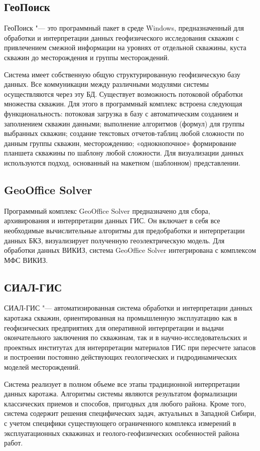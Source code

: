 \subsection{ГеоПоиск} \label{subsect_Poisk}
ГеоПоиск "--- это программный пакет в среде Windows, предназначенный для
обработки и интерпретации данных геофизического исследования скважин с
привлечением смежной информации на уровнях от отдельной скважины, куста
скважин до месторождения и группы месторождений.

Система имеет собственную общую структурированную геофизическую базу
данных. Все коммуникации между различными модулями системы осуществляются
через эту БД. Существует возможность потоковой обработки множества скважин.
Для этого в программный комплекс встроена следующая функциональность:
потоковая загрузка в базу с автоматическим созданием и заполнением скважин
данными; выполнение алгоритмов (формул) для группы выбранных скважин;
создание текстовых отчетов-таблиц любой сложности по данным группы скважин,
месторождению; «однокнопочное» формирование планшета скважины по шаблону
любой сложности. Для визуализации данных используются подход, основанный на
макетном (шаблонном) представлении.

\subsection{GeoOffice Solver} \label{subsect_Solver}
Программный комплекс GeoOffice Solver предназначено для сбора,
архивирования и интерпретации данных ГИС. Он включает в себя все
необходимые вычислительные алгоритмы для предобработки и интерпретации
данных БКЗ, визуализирует полученную геоэлектрическую модель. Для обработки
данных ВИКИЗ, система GeoOffice Solver интегрирована с комплексом МФС
ВИКИЗ.

\subsection{СИАЛ-ГИС} \label{subsect_Sial}
СИАЛ-ГИС "--- автоматизированная система обработки и интерпретации данных
каротажа скважин, ориентированная на промышленную эксплуатацию как в
геофизических предприятиях для оперативной интерпретации и выдачи
окончательного заключения по скважинам, так и в научно-исследовательских и
проектных институтах для интерпретации материалов ГИС при пересчете запасов
и построении постоянно действующих геологических и гидродинамических
моделей месторождений.

Система реализует в полном объеме все этапы традиционной интерпретации
данных каротажа. Алгоритмы системы являются результатом формализации
классических приемов и способов, пригодных для любого района. Кроме того,
система содержит решения специфических задач, актуальных в Западной Сибири,
с учетом специфики существующего ограниченного комплекса измерений в
эксплуатационных скважинах и геолого-геофизических особенностей района
работ.

